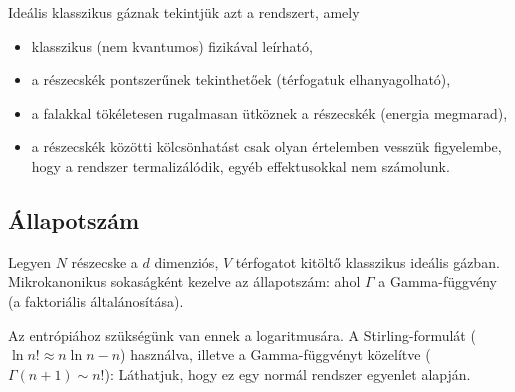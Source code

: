   Ideális klasszikus gáznak tekintjük azt a rendszert, amely
  \begin{itemize}
   \item klasszikus (nem kvantumos) fizikával leírható,
   \item a részecskék pontszerűnek tekinthetőek (térfogatuk elhanyagolható),
   \item a falakkal tökéletesen rugalmasan ütköznek a részecskék (energia megmarad),
   \item a részecskék közötti kölcsönhatást csak olyan értelemben vesszük figyelembe, hogy a rendszer termalizálódik, egyéb effektusokkal nem számolunk.
  \end{itemize}
  
  \subsection{Állapotszám}
  
   Legyen $N$ részecske a $d$ dimenziós, $V$ térfogatot kitöltő klasszikus ideális gázban.
   Mikrokanonikus sokaságként kezelve az állapotszám:
   ahol $\Gamma$ a Gamma-függvény (a faktoriális általánosítása).
   
   Az entrópiához szükségünk van ennek a logaritmusára.
   A Stirling-formulát ($\ln n!\approx n\ln n-n$) használva, illetve a Gamma-függvényt közelítve ($\Gamma(n+1)\sim n!$): 
   Láthatjuk, hogy ez egy normál rendszer  egyenlet alapján. 
   
